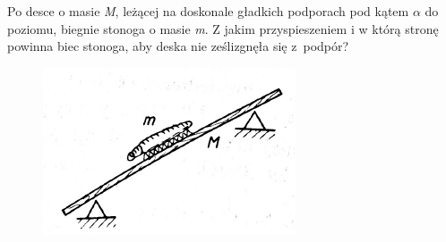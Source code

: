 Po desce o masie \emph{M}, leżącej na doskonale gładkich podporach pod kątem \emph{$\alpha$} do poziomu, biegnie stonoga o masie \emph{m}. Z jakim przyspieszeniem i w którą stronę powinna biec stonoga, aby deska nie ześlizgnęła się z~podpór?
\begin{figure}[h]
	\centering
	\includegraphics[width=0.3\linewidth]{../rysunki/dynamika/stonoga1.png}
\end{figure}

